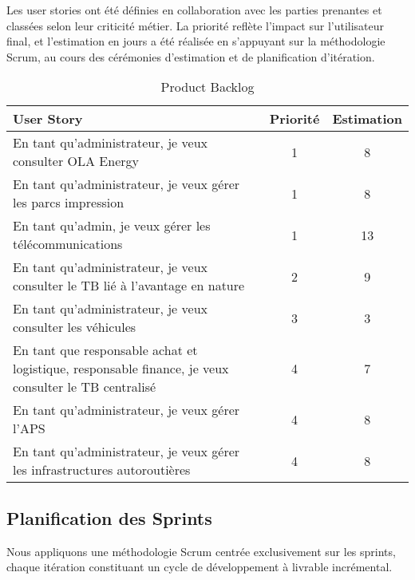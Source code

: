 \documentclass[a4paper,11pt]{report}
\begin{document}
Les user stories ont été définies en collaboration avec les parties prenantes et classées selon leur criticité métier.  
La priorité reflète l’impact sur l’utilisateur final, et l’estimation en jours a été réalisée en s’appuyant sur la méthodologie Scrum, au cours des cérémonies d’estimation et de planification d’itération.  

\begin{table}[h]
\centering
\begin{tabular}{|p{}|c|c|}
\hline
\textbf{User Story} & \textbf{Priorité} & \textbf{Estimation} \\
\hline
En tant qu’administrateur, je veux consulter OLA Energy & 1 & 8 \\
\hline

\hline
En tant qu’administrateur, je veux gérer les parcs impression & 1 & 8 \\
\hline
En tant qu’admin, je veux gérer les télécommunications & 1 & 13 \\
\hline

En tant qu’administrateur, je veux consulter le TB lié à l’avantage en nature & 2 & 9 \\
\hline
En tant qu’administrateur, je veux consulter les véhicules & 3 & 3 \\
\hline

En tant que responsable achat et logistique, responsable finance, je veux consulter le TB centralisé & 4 & 7 \\
\hline
En tant qu’administrateur, je veux gérer l’APS & 4 & 8 \\
\hline
En tant qu’administrateur, je veux gérer les infrastructures autoroutières & 4 & 8 \\
\hline
\end{tabular}
\caption{Product Backlog}
\end{table}

	
\newpage

\subsection{Planification des Sprints}
\renewcommand{\arraystretch}{1.5} %

Nous appliquons une méthodologie Scrum centrée exclusivement sur les sprints, chaque itération constituant un cycle de développement à livrable incrémental.  
\end{document}
